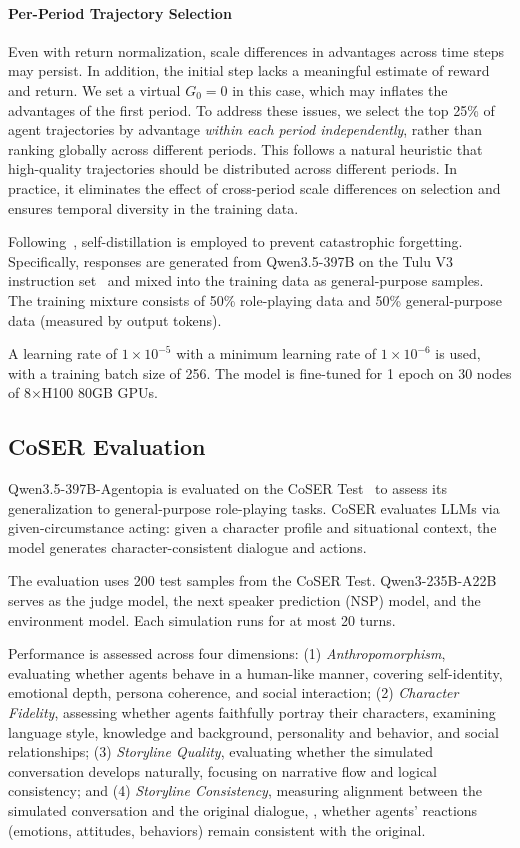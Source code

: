 \paragraph{Per-Period Trajectory Selection}
Even with return normalization, scale differences in advantages across time steps may persist.
In addition, the initial step lacks a meaningful estimate of reward and return.
We set a virtual $G_0 = 0$ in this case, which may inflates the advantages of the first period.
To address these issues, we select the top 25\% of agent trajectories by advantage \textit{within each period independently}, rather than ranking globally across different periods.
This follows a natural heuristic that high-quality trajectories should be distributed across different periods.
In practice, it eliminates the effect of cross-period scale differences on selection and ensures temporal diversity in the training data.

Following~\citet{lu2025onpolicy}, self-distillation is employed to prevent catastrophic forgetting.
Specifically, responses are generated from Qwen3.5-397B on the Tulu V3 instruction set~\citep{lambert2024tulu}
and mixed into the training data as general-purpose samples.
The training mixture consists of 50\% role-playing data and 50\% general-purpose data (measured by output tokens).

A learning rate of $1 \times 10^{-5}$ with a minimum learning rate of $1 \times 10^{-6}$ is used,
with a training batch size of 256.
The model is fine-tuned for 1 epoch on 30 nodes of 8$\times$H100 80GB GPUs.


\subsection{CoSER Evaluation}
\label{sec:appendix_coser}

Qwen3.5-397B-Agentopia is evaluated on the CoSER Test~\citep{wang2025coser}
to assess its generalization to general-purpose role-playing tasks.
CoSER evaluates LLMs via given-circumstance acting:
given a character profile and situational context,
the model generates character-consistent dialogue and actions.

The evaluation uses 200 test samples from the CoSER Test.
Qwen3-235B-A22B~\citep{qwen3} serves as the judge model,
the next speaker prediction (NSP) model, and the environment model.
Each simulation runs for at most 20 turns.

Performance is assessed across four dimensions:
(1) \textit{Anthropomorphism}, evaluating whether agents behave in a human-like manner,
covering self-identity, emotional depth, persona coherence, and social interaction;
(2) \textit{Character Fidelity}, assessing whether agents faithfully portray their characters,
examining language style, knowledge and background, personality and behavior, and social relationships;
(3) \textit{Storyline Quality}, evaluating whether the simulated conversation develops naturally,
focusing on narrative flow and logical consistency;
and (4) \textit{Storyline Consistency}, measuring alignment between the simulated conversation
and the original dialogue,
\ie, whether agents' reactions (emotions, attitudes, behaviors) remain consistent with the original.

